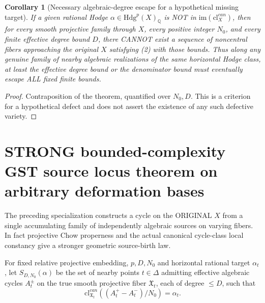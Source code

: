 \documentclass[11pt]{article}
\newcommand{\Q}{\mathbb Q}
\newcommand{\Hdg}{\mathrm{Hdg}}
\newcommand{\cl}{\mathrm{cl}}
\newcommand{\im}{\mathrm{im}}
\newtheorem{corollary}[theorem]{Corollary}
\begin{document}
\begin{corollary}[Necessary algebraic-degree escape for a hypothetical missing target]
If a given rational Hodge
\(\alpha\in\Hdg^p(X)_\Q\)
is NOT in
\(\im(\cl_X^{can})\),
then for every smooth projective
family through \(X\), every positive
integer \(N_0\), and every finite
effective degree bound \(D\),
there CANNOT exist a sequence
of noncentral fibers approaching
the original \(X\) satisfying
(2) with those bounds.
Thus along any genuine family of
nearby algebraic realizations of
the same horizontal Hodge class,
at least the effective degree
bound or the denominator bound
must eventually escape ALL
fixed finite bounds.
\end{corollary}
\begin{proof}
Contraposition of the theorem,
quantified over \(N_0,D\).
This is a criterion for a
hypothetical defect and does
not assert the existence of
any such defective variety.
\end{proof}

\section{STRONG bounded-complexity GST source locus theorem on arbitrary deformation bases}
The preceding specialization
constructs a cycle on
the ORIGINAL \(X\)
from a single
accumulating family
of independently
algebraic sources
on varying
fibers.
In fact
projective Chow
properness and
the actual
canonical
cycle-class
local constancy
give a stronger
geometric
source-birth
law.

For fixed
relative projective
embedding, \(p,D,N_0\)
and horizontal
rational target
\(\alpha_t\),
let \(S_{D,N_0}(\alpha)\)
be the set
of nearby points
\(t\in\Delta\)
admitting
effective algebraic
cycles \(A_t^\pm\)
on the true
smooth projective
fiber \(\mathfrak X_t\),
each of degree
\(\le D\),
such that
\[
 \cl_{\mathfrak X_t}^{can}
       ((A_t^+-A_t^-)/N_0)
                    =\alpha_t.
\]
\end{document}
